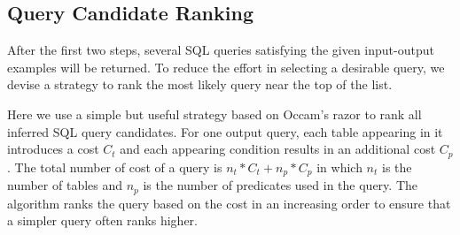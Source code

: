 \subsection{Query Candidate Ranking}
\label{sec:ranking}

After the first two steps, several SQL queries satisfying the given input-output examples
will be returned. To reduce the effort in selecting a desirable query, we devise a strategy
to rank the most likely query near the top of the list.

Here we use a simple but useful strategy based on Occam's razor to rank all inferred SQL query candidates.
For one output query, each table appearing in it introduces a cost $C_t$ and each appearing condition 
results in an additional cost $C_p$. The total number of cost of a query is $n_t*C_t+n_p*C_p$ in which
$n_t$ is the number of tables and $n_p$ is the number of predicates used in the query. The algorithm
ranks the query based on the cost in an increasing order to ensure that a simpler query often ranks higher.

